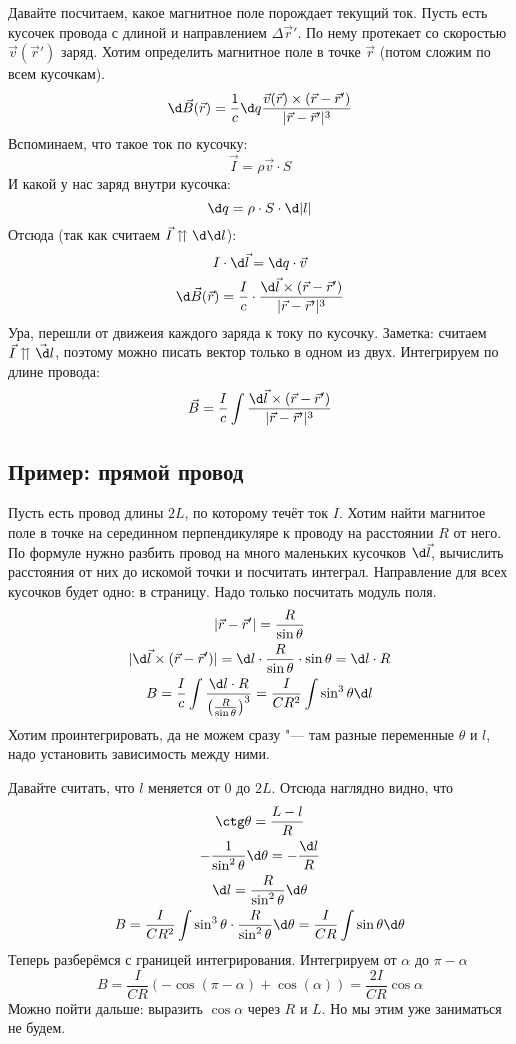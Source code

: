 	Давайте посчитаем, какое магнитное поле порождает текущий ток.
	Пусть есть кусочек провода с длиной и направлением $\Delta \vec r'$.
	По нему протекает со скоростью $\vec v(\vec r')$ заряд.
	Хотим определить магнитное поле в точке $\vec r$ (потом сложим по всем кусочкам).
	\[ \d \vec B(\vec r) = \frac 1 c \d q \frac{\vec v(\vec r) \times (\vec r - \vec r')}{|\vec r - \vec r'|^3}\]
	Вспоминаем, что такое ток по кусочку:
	\[ \vec I = \rho \vec v \cdot S \]
	И какой у нас заряд внутри кусочка:
	\[ \d q = \rho \cdot S \cdot \d |l|\]
	Отсюда (так как считаем $\vec I \upuparrows \d \d l$):
	\begin{gather*}
		I \cdot \d \vec l = \d q \cdot \vec v \\
		\d \vec B(\vec r) = \frac I c \cdot \frac{\d \vec l \times (\vec r - \vec r')}{|\vec r - \vec r'|^3}
	\end{gather*}
	Ура, перешли от движеия каждого заряда к току по кусочку.
	Заметка: считаем $\vec I \upuparrows \vec \d l$, поэтому можно писать вектор только в одном из двух.
	Интегрируем по длине провода:
	\[
		\vec B = \frac I c \int \frac{\d \vec l \times (\vec r - \vec r')}{|\vec r - \vec r'|^3}
	\]

	\subsection{Пример: прямой провод}
	Пусть есть провод длины $2L$, по которому течёт ток $I$.
	Хотим найти магнитое поле в точке на серединном перпендикуляре к проводу на расстоянии $R$ от него.
	По формуле нужно разбить провод на много маленьких кусочков $\d \vec l$,
	вычислить расстояния от них до искомой точки и посчитать интеграл.
	Направление для всех кусочков будет одно: в страницу.
	Надо только посчитать модуль поля.
	\begin{gather*}
	| \vec r - \vec r' | = \frac R{\sin \theta} \\
	| \d \vec l \times (\vec r - \vec r') | = \d l \cdot \frac{R}{\sin \theta} \cdot \sin \theta = \d l \cdot R \\
	B = \frac I c \int \frac{\d l \cdot R}{\left(\frac R{\sin \theta}\right)^3}
	  = \frac I {CR^2} \int \sin^3 \theta \d l
	\end{gather*}
	Хотим проинтегрировать, да не можем сразу "--- там разные переменные $\theta$ и $l$, надо установить зависимость между ними.
	
	Давайте считать, что $l$ меняется от $0$ до $2L$.
	Отсюда наглядно видно, что
	\begin{gather*}
		\ctg \theta = \frac{L-l}{R} \\
		- \frac 1 {\sin^2\theta} \d \theta = -\frac{\d l}{R} \\
		\d l = \frac{R}{\sin^2 \theta} \d \theta \\
		   B = \frac{I}{CR^2} \int \sin^3 \theta \cdot \frac{R}{\sin^2 \theta} \d \theta
		     = \frac{I}{CR} \int \sin \theta \d \theta
	\end{gather*}
	Теперь разберёмся с границей интегрирования.
	Интегрируем от $\alpha$ до $\pi-\alpha$
	\[ B = \frac{I}{CR} (-\cos(\pi-\alpha) + \cos(\alpha)) = \frac{2I}{CR} \cos \alpha\]
	Можно пойти дальше: выразить $\cos \alpha$ через $R$ и $L$.
	Но мы этим уже заниматься не будем.

